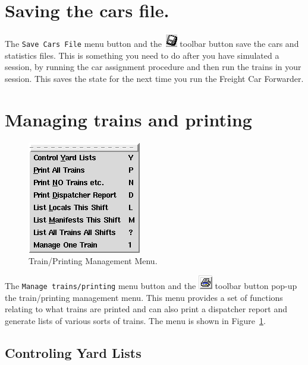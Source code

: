 \section{Saving the cars file.}

The \verb=Save Cars File= menu button and the \includegraphics{FCFSaveCarsTool.png} 
toolbar button save the cars and statistics files. This is something you
need to do after you have simulated a session, by running the car
assignment procedure and then run the trains in your session.  This
saves the state for the next time you run the Freight Car Forwarder.

\section{Managing trains and printing}
\begin{figure}[hbpt]
\begin{centering}
\includegraphics{FCFManageTrainsMenu.png}
\caption{Train/Printing Management Menu.}
\label{fig:fcf:FCFManageTrainsMenu}
\end{centering}
\end{figure}
The \verb=Manage trains/printing= menu button and the 
\includegraphics{FCFManageTrainsTool.png} toolbar button pop-up the
train/printing management menu.  This menu provides a set of functions
relating to what trains are printed and can also  print a dispatcher
report and generate lists of various sorts of trains.  The menu is shown
in  Figure~\ref{fig:fcf:FCFManageTrainsMenu}.

\subsection{Controling Yard Lists}

